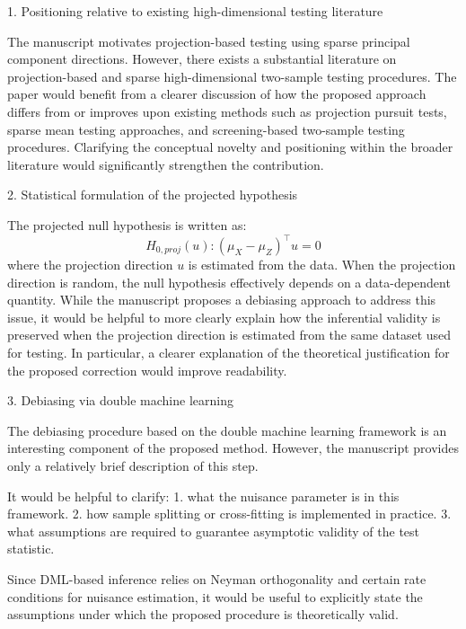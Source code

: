 \documentclass{article}
\theoremstyle{definition}
\begin{document}
\begin{shaded}
    1. Positioning relative to existing high-dimensional testing literature
    
The manuscript motivates projection-based testing using sparse principal component directions. However, there exists a substantial literature on projection-based and sparse high-dimensional two-sample testing procedures. The paper would benefit from a clearer discussion of how the proposed approach differs from or improves upon existing methods such as projection pursuit tests, sparse mean testing approaches, and screening-based two-sample testing procedures. Clarifying the conceptual novelty and positioning within the broader literature would significantly strengthen the contribution.
\end{shaded}

\begin{shaded}
    2. Statistical formulation of the projected hypothesis

The projected null hypothesis is written as:
$$
H_{0, proj}(u): (\mu_X - \mu_Z)^\top u = 0
$$
where the projection direction $u$ is estimated from the data. When the projection direction is random, the null hypothesis effectively depends on a data-dependent quantity. While the manuscript proposes a debiasing approach to address this issue, it would be helpful to more clearly explain how the inferential validity is preserved when the projection direction is estimated from the same dataset used for testing. In particular, a clearer explanation of the theoretical justification for the proposed correction would improve readability.
\end{shaded}

\begin{shaded}
    3. Debiasing via double machine learning

The debiasing procedure based on the double machine learning framework is an interesting component of the proposed method. However, the manuscript provides only a relatively brief description of this step.

It would be helpful to clarify: 1. what the nuisance parameter is in this framework. 2. how sample splitting or cross-fitting is implemented in practice. 3. what assumptions are required to guarantee asymptotic validity of the test statistic.

Since DML-based inference relies on Neyman orthogonality and certain rate conditions for nuisance estimation, it would be useful to explicitly state the assumptions under which the proposed procedure is theoretically valid.
\end{shaded}
\end{document}
